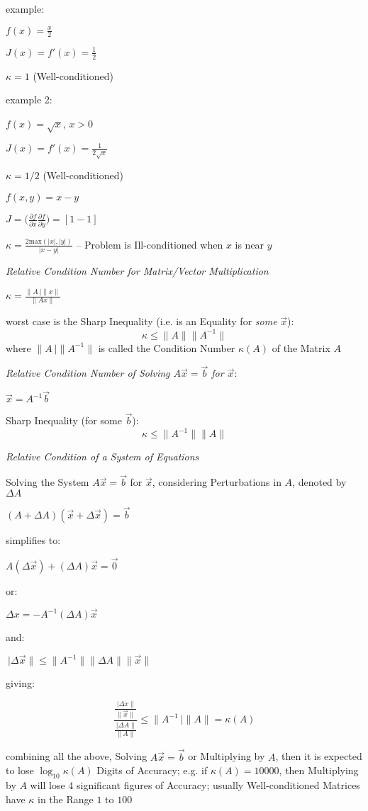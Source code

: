 example:

$f(x) = \frac{x}{2}$

$J(x) = f'(x) = \frac{1}{2}$

$\kappa = 1$ (Well-conditioned)

example 2:

$f(x) = \sqrt x$, $x > 0$

$J(x) = f'(x) = \frac{1}{2\sqrt{x}}$

$\kappa = 1/2$ (Well-conditioned)

$f(x,y) = x - y$

$J = \Big(
  \frac{\partial{f}}{\partial{x}}
  \frac{\partial{f}}{\partial{y}}
\Big) = [1 -1]$

$\kappa = \frac{2 \mathrm{max}(|x|,|y|)}{|x - y|}$ --
Problem is Ill-conditioned when $x$ is near $y$


\emph{Relative Condition Number for Matrix/Vector Multiplication}

$\kappa = \frac{\|A\ |\|x\|}{\|Ax\|}$

worst case is the Sharp Inequality (i.e. is an Equality for \emph{some}
$\vec{x}$):
\[
  \kappa \leq \|A\| \|A^{-1}\|
\]
where $\|A\ |\|A^{-1}\|$ is called the Condition Number $\kappa(A)$ of the
Matrix $A$


\emph{Relative Condition Number of Solving $A\vec{x} = \vec{b}$ for $\vec{x}$}:

$\vec{x} = A^{-1}\vec{b}$

Sharp Inequality (for some $\vec{b}$):
\[
  \kappa \leq \|A^{-1}\| \|A\|
\]


\emph{Relative Condition of a System of Equations}

Solving the System $A\vec{x} = \vec{b}$ for $\vec{x}$, considering
Perturbations in $A$, denoted by $\Delta A$

$(A + \Delta A)(\vec{x} + \Delta\vec{x}) = \vec{b}$

simplifies to:

$A(\Delta\vec{x}) + (\Delta A)\vec{x} = \vec{0}$

or:

$\Delta x = -A^{-1}(\Delta A)\vec{x}$

and:

$\ |\Delta\vec{x}\| \leq \|A^{-1}\| \|\Delta{A}\| \|\vec{x}\|$

giving:

\[
  \frac{
    \frac{\ |\Delta{x}\|}{\|\vec{x}\|}
  }{
    \frac{\ |\Delta{A}\|}{\|A\|}
  }
  \leq \|A^{-1}\ |\|A\| = \kappa(A)
\]

combining all the above, Solving $A\vec{x} = \vec{b}$ or Multiplying by $A$,
then it is expected to lose $\log_{10} \kappa(A)$ Digits of Accuracy; e.g. if
$\kappa(A) = 10000$, then Multiplying by $A$ will lose $4$ significant figures
of Accuracy; usually Well-conditioned Matrices have $\kappa$ in the Range $1$
to $100$



